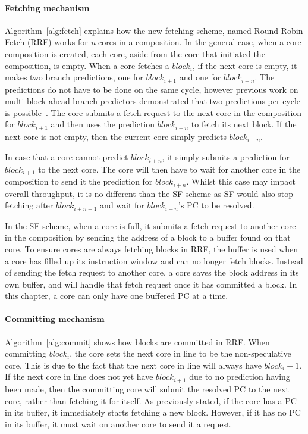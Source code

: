 \paragraph*{Fetching mechanism}
Algorithm~\ref{alg:fetch} explains how the new fetching scheme, named Round Robin Fetch (RRF) works for \textit{n} cores in a composition.
In the general case, when a core composition is created, each core, aside from the core that initiated the composition, is empty.
When a core fetches a $block_i$, if the next core is empty, it makes two branch predictions, one for $block_{i+1}$ and one for $block_{i+n}$.
The predictions do not have to be done on the same cycle, however previous work on multi-block ahead branch predictors demonstrated that two predictions per cycle is possible~\cite{SeznecMultipleBlock}.
The core submits a fetch request to the next core in the composition for $block_{i+1}$ and then uses the prediction $block_{i+n}$ to fetch its next block.
If the next core is not empty, then the current core simply predicts $block_{i+n}$.

In case that a core cannot predict $block_{i+n}$, it simply submits a prediction for $block_{i+1}$ to the next core.
The core will then have to wait for another core in the composition to send it the prediction for $block_{i+n}$.
Whilst this case may impact overall throughput, it is no different than the SF scheme as SF would also stop fetching after $block_{i+n-1}$ and wait for $block_{i+n}$'s PC to be resolved.

In the SF scheme, when a core is full, it submits a fetch request to another core in the composition by sending the address of a block to a buffer found on that core.
To ensure cores are always fetching blocks in RRF, the buffer is used when a core has filled up its instruction window and can no longer fetch blocks.
Instead of sending the fetch request to another core, a core saves the block address in its own buffer, and will handle that fetch request once it has committed a block.
In this chapter, a core can only have one buffered PC at a time.

\paragraph*{Committing mechanism}
Algorithm~\ref{alg:commit} shows how blocks are committed in RRF.
When committing $block_i$, the core sets the next core in line to be the non-speculative core.
This is due to the fact that the next core in line will always have $block_i+1$.
If the next core in line does not yet have $block_{i+1}$ due to no prediction having been made, then the committing core will submit the resolved PC to the next core, rather than fetching it for itself.
As previously stated, if the core has a PC in its buffer, it immediately starts fetching a new block.
However, if it has no PC in its buffer, it must wait on another core to send it a request.

